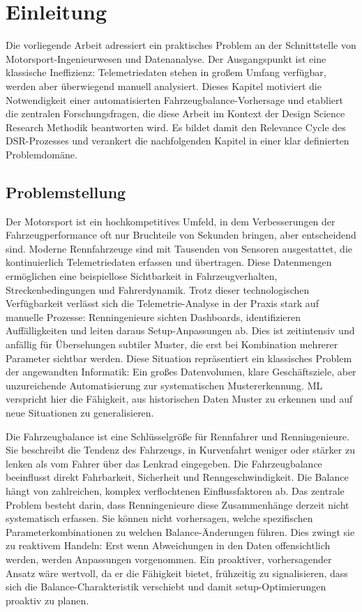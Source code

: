 \chapter{Einleitung}
Die vorliegende Arbeit adressiert ein praktisches Problem an der Schnittstelle von Motorsport-Ingenieurwesen und Datenanalyse. Der Ausgangspunkt ist eine klassische Ineffizienz: Telemetriedaten stehen in großem Umfang verfügbar, werden aber überwiegend manuell analysiert. Dieses Kapitel motiviert die Notwendigkeit einer automatisierten Fahrzeugbalance-Vorhersage und etabliert die zentralen Forschungsfragen, die diese Arbeit im Kontext der Design Science Research Methodik beantworten wird. Es bildet damit den Relevance Cycle des \ac{DSR}-Prozesses und verankert die nachfolgenden Kapitel in einer klar definierten Problemdomäne.

\section{Problemstellung}

Der Motorsport ist ein hochkompetitives Umfeld, in dem Verbesserungen der Fahrzeugperformance oft nur Bruchteile von Sekunden bringen, aber entscheidend sind. Moderne Rennfahrzeuge sind mit Tausenden von Sensoren ausgestattet, die kontinuierlich Telemetriedaten erfassen und übertragen. Diese Datenmengen ermöglichen eine beispiellose Sichtbarkeit in Fahrzeugverhalten, Streckenbedingungen und Fahrerdynamik. Trotz dieser technologischen Verfügbarkeit verlässt sich die Telemetrie-Analyse in der Praxis stark auf manuelle Prozesse: Renningenieure sichten Dashboards, identifizieren Auffälligkeiten und leiten daraus Setup-Anpassungen ab. Dies ist zeitintensiv und anfällig für Übersehungen subtiler Muster, die erst bei Kombination mehrerer Parameter sichtbar werden.
Diese Situation repräsentiert ein klassisches Problem der angewandten Informatik: Ein großes Datenvolumen, klare Geschäftsziele, aber unzureichende Automatisierung zur systematischen Mustererkennung. \ac{ML} verspricht hier die Fähigkeit, aus historischen Daten Muster zu erkennen und auf neue Situationen zu generalisieren.

Die Fahrzeugbalance ist eine Schlüsselgröße für Rennfahrer und Renningenieure. Sie beschreibt die Tendenz des Fahrzeugs, in Kurvenfahrt weniger oder stärker zu lenken als vom Fahrer über das Lenkrad eingegeben. Die Fahrzeugbalance beeinflusst direkt Fahrbarkeit, Sicherheit und Renngeschwindigkeit. Die Balance hängt von zahlreichen, komplex verflochtenen Einflussfaktoren ab.
Das zentrale Problem besteht darin, dass Renningenieure diese Zusammenhänge derzeit nicht systematisch erfassen. Sie können nicht vorhersagen, welche spezifischen Parameterkombinationen zu welchen Balance-Änderungen führen. Dies zwingt sie zu reaktivem Handeln: Erst wenn Abweichungen in den Daten offensichtlich werden, werden Anpassungen vorgenommen. Ein proaktiver, vorhersagender Ansatz wäre wertvoll, da er die Fähigkeit bietet, frühzeitig zu signalisieren, dass sich die Balance-Charakteristik verschiebt und damit setup-Optimierungen proaktiv zu planen.

